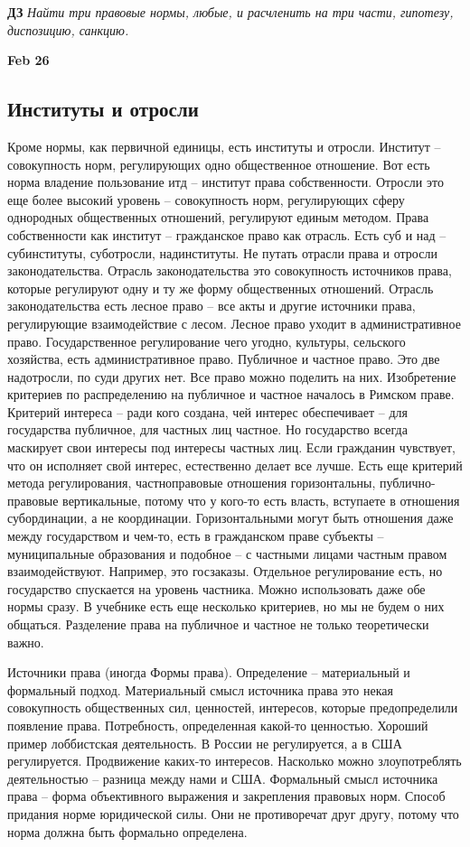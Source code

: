 \documentclass[a4paper, 12pt]{article}
\def\datee#1{\hfill\textbf{#1} \par}
\begin{document}
\textbf{ДЗ} \textit{Найти три правовые нормы, любые, и расчленить на три части, гипотезу, диспозицию, санкцию. }


\datee{Feb 26}

\subsection{Институты и отросли}

Кроме нормы, как первичной единицы, есть институты и отросли. Институт -- совокупность норм, регулирующих одно общественное отношение. Вот есть норма владение пользование итд -- институт права собственности. Отросли это еще более высокий уровень -- совокупность норм, регулирующих сферу однородных общественных отношений, регулируют единым методом. Права собственности как институт -- гражданское право как отрасль. Есть суб и над -- субинституты, суботросли, надинституты. Не путать отрасли права и отросли законодательства. Отрасль законодательства это совокупность источников права, которые регулируют одну и ту же форму общественных отношений. Отрасль законодательства есть лесное право -- все акты и другие источники права, регулирующие взаимодействие с лесом. Лесное право уходит в административное право. Государственное регулирование чего угодно, культуры, сельского хозяйства, есть административное право. Публичное и частное право. Это две надотросли, по суди других нет. Все право можно поделить на них. Изобретение критериев по распределению на публичное и частное началось в Римском праве. Критерий интереса -- ради кого создана, чей интерес обеспечивает -- для государства публичное, для частных лиц частное. Но государство всегда маскирует свои интересы под интересы частных лиц. Если гражданин чувствует, что он исполняет свой интерес, естественно делает все лучше. Есть еще критерий метода регулирования, частноправовые отношения горизонтальны, публично-правовые вертикальные, потому что у кого-то есть власть, вступаете в отношения субординации, а не координации. Горизонтальными могут быть отношения даже между государством и чем-то, есть в гражданском праве субъекты -- муниципальные образования и подобное -- с частными лицами частным правом взаимодействуют. Например, это госзаказы. Отдельное регулирование есть, но государство спускается на уровень частника. Можно использовать даже обе нормы сразу. В учебнике есть еще несколько критериев, но мы не будем о них общаться. Разделение права на публичное и частное не только теоретически важно. 

Источники права (иногда Формы права). Определение -- материальный и формальный подход. Материальный смысл источника права это некая совокупность общественных сил, ценностей, интересов, которые предопределили появление права. Потребность, определенная какой-то ценностью. Хороший пример лоббистская деятельность. В России не регулируется, а в США регулируется. Продвижение каких-то интересов. Насколько можно злоупотреблять деятельностью -- разница между нами и США. Формальный смысл источника права -- форма объективного выражения и закрепления правовых норм. Способ придания норме юридической силы. Они не противоречат друг другу, потому что норма должна быть формально определена. 
\end{document}
